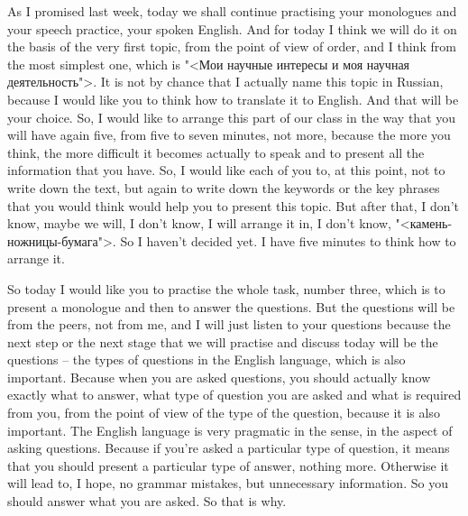 \documentclass[main.tex]{subfiles}
\begin{document}

As I promised last week, today we shall continue practising your monologues and your speech practice, your spoken English.
And for today I think we will do it on the basis of the very first topic, from the point of view of order, and I think from the most simplest one, which is "<Мои научные интересы и моя научная деятельность">.
It is not by chance that I actually name this topic in Russian, because I would like you to think how to translate it to English.
And that will be your choice.
So, I would like to arrange this part of our class in the way that you will have again five, from five to seven minutes, not more, because the more you think, the more difficult it becomes actually to speak and to present all the information that you have.
So, I would like each of you to, at this point, not to write down the text, but again to write down the keywords or the key phrases that you would think would help you to present this topic.
But after that, I don't know, maybe we will, I don't know, I will arrange it in, I don't know, "<камень-ножницы-бумага">.
So I haven't decided yet.
I have five minutes to think how to arrange it.

So today I would like you to practise the whole task, number three, which is to present a monologue and then to answer the questions.
But the questions will be from the peers, not from me, and I will just listen to your questions because the next step or the next stage that we will practise and discuss today will be the questions -- the types of questions in the English language, which is also important.
Because when you are asked questions, you should actually know exactly what to answer, what type of question you are asked and what is required from you, from the point of view of the type of the question, because it is also important.
The English language is very pragmatic in the sense, in the aspect of asking questions.
Because if you're asked a particular type of question, it means that you should present a particular type of answer, nothing more.
Otherwise it will lead to, I hope, no grammar mistakes, but unnecessary information.
So you should answer what you are asked.
So that is why.
\end{document}
